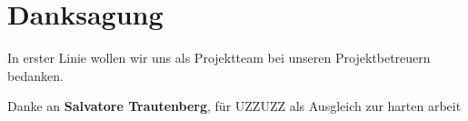 \chapter{Danksagung} 

In erster Linie wollen wir uns als Projektteam bei unseren Projektbetreuern bedanken. 

Danke an \textbf{Salvatore Trautenberg}, für UZZUZZ als Ausgleich zur harten arbeit